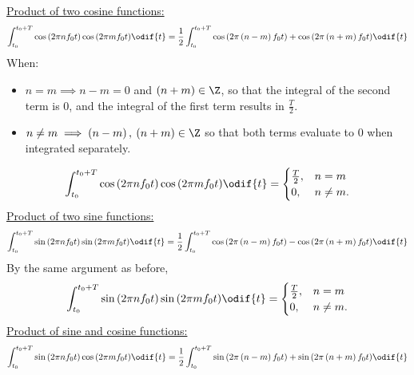 \documentclass{article}
\begin{document}
\underline{Product of two cosine functions:}
\begin{equation*}
    \int_{t_0}^{t_0 + T} \cos{\left( 2\pi n f_0 t \right)} \cos{\left( 2\pi m f_0 t \right)} \odif{t} = \frac{1}{2} \int_{t_0}^{t_0 + T} \cos{\left( 2 \pi \left( n - m \right) f_0 t \right)} + \cos{\left( 2 \pi \left( n + m \right) f_0 t \right)} \odif{t}
\end{equation*}
When:
\begin{itemize}
    \item \(n = m \implies n - m = 0\) and \(\left( n + m \right) \in \Z\),
          so that the integral of the second term is \(0\), and the
          integral of the first term results in \(\frac{T}{2}\).
    \item \(n \neq m \implies \left( n - m \right),\: \left( n + m \right) \in \Z\)
          so that both terms evaluate to \(0\) when integrated separately.
\end{itemize}
\begin{equation*}
    \int_{t_0}^{t_0 + T} \cos{\left( 2\pi n f_0 t \right)} \cos{\left( 2\pi m f_0 t \right)} \odif{t} =
    \begin{cases}
        \frac{T}{2}, & n = m     \\
        0,           & n \neq m.
    \end{cases}
\end{equation*}
\underline{Product of two sine functions:}
\begin{equation*}
    \int_{t_0}^{t_0 + T} \sin{\left( 2\pi n f_0 t \right)} \sin{\left( 2\pi m f_0 t \right)} \odif{t} = \frac{1}{2} \int_{t_0}^{t_0 + T} \cos{\left( 2 \pi \left( n - m \right) f_0 t \right)} - \cos{\left( 2 \pi \left( n + m \right) f_0 t \right)} \odif{t}
\end{equation*}
By the same argument as before,
\begin{equation*}
    \int_{t_0}^{t_0 + T} \sin{\left( 2\pi n f_0 t \right)} \sin{\left( 2\pi m f_0 t \right)} \odif{t} =
    \begin{cases}
        \frac{T}{2}, & n = m     \\
        0,           & n \neq m.
    \end{cases}
\end{equation*}
\underline{Product of sine and cosine functions:}
\begin{equation*}
    \int_{t_0}^{t_0 + T} \sin{\left( 2\pi n f_0 t \right)} \cos{\left( 2\pi m f_0 t \right)} \odif{t} = \frac{1}{2} \int_{t_0}^{t_0 + T} \sin{\left( 2 \pi \left( n - m \right) f_0 t \right)} + \sin{\left( 2 \pi \left( n + m \right) f_0 t \right)} \odif{t}
\end{equation*}
\end{document}
